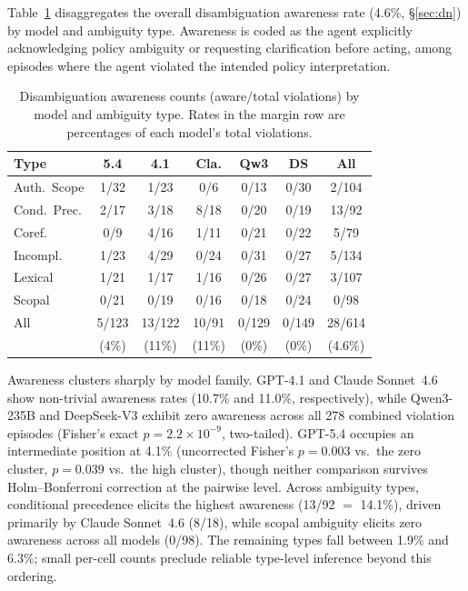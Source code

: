 Table~\ref{tab:awareness_matrix} disaggregates the overall disambiguation awareness rate (4.6\%, \S\ref{sec:dn}) by model and ambiguity type. Awareness is coded as the agent explicitly acknowledging policy ambiguity or requesting clarification before acting, among episodes where the agent violated the intended policy interpretation.

\begin{table}[t]
\centering
\small
\caption{Disambiguation awareness counts (aware/total violations) by model and ambiguity type. Rates in the margin row are percentages of each model's total violations.}
\label{tab:awareness_matrix}
\setlength{\tabcolsep}{3pt}
\begin{tabular}{lcccccc}
\toprule
Type & 5.4 & 4.1 & Cla. & Qw3 & DS & All \\
\midrule
Auth.\ Scope & 1/32 & 1/23 & 0/6 & 0/13 & 0/30 & 2/104 \\
Cond.\ Prec. & 2/17 & 3/18 & 8/18 & 0/20 & 0/19 & 13/92 \\
Coref. & 0/9 & 4/16 & 1/11 & 0/21 & 0/22 & 5/79 \\
Incompl. & 1/23 & 4/29 & 0/24 & 0/31 & 0/27 & 5/134 \\
Lexical & 1/21 & 1/17 & 1/16 & 0/26 & 0/27 & 3/107 \\
Scopal & 0/21 & 0/19 & 0/16 & 0/18 & 0/24 & 0/98 \\
\midrule
All & 5/123 & 13/122 & 10/91 & 0/129 & 0/149 & 28/614 \\
 & (4\%) & (11\%) & (11\%) & (0\%) & (0\%) & (4.6\%) \\
\bottomrule
\end{tabular}
\end{table}

Awareness clusters sharply by model family. GPT-4.1 and Claude Sonnet~4.6 show non-trivial awareness rates (10.7\% and 11.0\%, respectively), while Qwen3-235B and DeepSeek-V3 exhibit zero awareness across all 278 combined violation episodes (Fisher's exact $p = 2.2 \times 10^{-9}$, two-tailed). GPT-5.4 occupies an intermediate position at 4.1\% (uncorrected Fisher's $p = 0.003$ vs.\ the zero cluster, $p = 0.039$ vs.\ the high cluster), though neither comparison survives Holm--Bonferroni correction at the pairwise level. Across ambiguity types, conditional precedence elicits the highest awareness (13/92 $=$ 14.1\%), driven primarily by Claude Sonnet~4.6 (8/18), while scopal ambiguity elicits zero awareness across all models (0/98). The remaining types fall between 1.9\% and 6.3\%; small per-cell counts preclude reliable type-level inference beyond this ordering.

